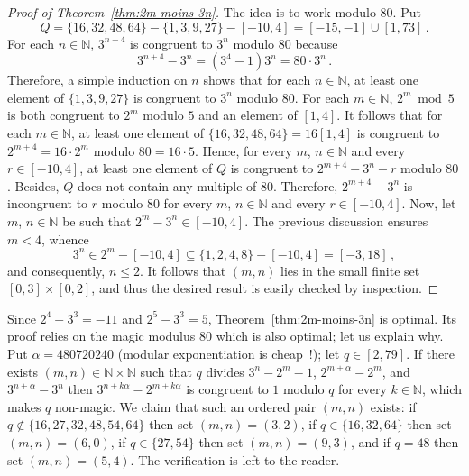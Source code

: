 \documentclass[12pt]{article}
\newcommand{\bN}{\mathbb{N}} %
\theoremstyle{definition}
\begin{document}
   \begin{proof}[Proof of Theorem~\ref{thm:2m-moins-3n}]
     The idea is to work modulo $80$.
     Put  
     $$
     Q  = \{ 16, 32, 48, 64 \}  - \{ 1, 3, 9, 27 \}  - [- 10, 4] = [-15, - 1] \cup [1, 73] \,.
     $$
     For each $n \in \bN$,
     $3^{n + 4}$ is congruent to $3^n$ modulo $80$ because 
     $$3^{n + 4} - 3^n =  (3^4 - 1) 3^n = 80 \cdot  3^n \, .
     $$
     Therefore,
     a simple induction on $n$ shows that for each $n \in \bN$,
     at least one element of $\{ 1, 3, 9, 27 \}$ is congruent to $3^n$ modulo $80$.
     For each $m \in \bN$,
     $2^m \bmod 5$
     is both congruent to $2^m$ modulo $5$ and an element of $[1, 4]$.
     It follows that for each $m \in \bN$,
     at least one element of
     $\{ 16, 32, 48, 64 \} = 16 [1, 4]$ is congruent to $2^{m + 4}  = 16  \cdot 2^m$ modulo $80 = 16 \cdot 5$.
     Hence, for every $m$, $n \in \bN$ and every $r \in [-10, 4]$, 
     at least one element of $Q$ is congruent to $2^{m + 4} - 3^n - r$ modulo $80$.
     Besides, $Q$ does not contain any multiple of $80$.
     Therefore,
     $2^{m + 4}  - 3^n$ is incongruent to $r$ modulo $80$
     for every $m$, $n \in \bN$ and every $r \in [- 10, 4]$.
     Now, let $m$, $n \in \bN$ be such that $2^m - 3^n \in [-10, 4]$.
     The previous discussion ensures $m < 4$,
     whence  
     $$
     3^n \in 2^m - [- 10, 4] \subseteq \{ 1, 2, 4, 8 \} - [- 10, 4] = [ -3, 18] \, ,
     $$
     and consequently, $n \le 2$.
     It follows that $(m, n)$ lies in the small finite set $[0, 3] \times [0, 2]$,
     and thus the desired result is easily checked by inspection.
   \end{proof}

   Since $2^4 - 3^3 = - 11$ and $2^5 - 3^3 = 5$,
   Theorem~\ref{thm:2m-moins-3n} is optimal.
   Its proof relies on the magic modulus $80$ which is also optimal; let us explain why.
   Put $\alpha = 480720240$ (modular exponentiation is cheap~!);
   let $q \in [2, 79]$.
   If there exists $(m, n) \in \bN \times \bN$ such that
   $q$ divides $3^n - 2^m - 1$, $2^{m + \alpha} - 2^m$, and $3^{n + \alpha} - 3^n$
   then
   $3^{n + k \alpha} - 2^{m + k \alpha}$ is congruent to $1$ modulo $q$ for every $k \in \bN$,
   which makes $q$ non-magic. 
   We claim that such an ordered pair $(m, n)$ exists: 
   if $q \notin \{ 16, 27, 32, 48, 54, 64 \}$ then set $(m, n) = (3, 2)$,
   if $q \in \{ 16, 32, 64 \}$ then set $(m, n) = (6, 0)$, 
   if $q \in \{ 27, 54 \}$ then set $(m, n) = (9, 3)$, and 
   if $q = 48$ then set $(m, n) = (5, 4)$.
   The verification is left to the reader.
\end{document}
